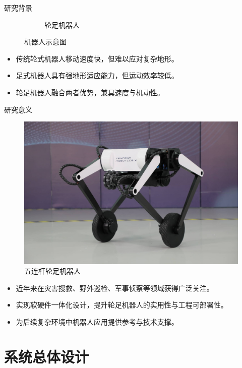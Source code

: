 \documentclass{beamer}
\begin{document}
\begin{frame}{研究背景}
\begin{figure}[t]
\begin{subfigure}{0.3\textwidth}
				\caption{轮足机器人}
			\end{subfigure}
			\captionsetup{font=scriptsize} 
			\caption{机器人示意图} 
		\end{figure}
		\begin{itemize}
			\item 传统轮式机器人移动速度快，但难以应对复杂地形。
			\item 足式机器人具有强地形适应能力，但运动效率较低。
			\item 轮足机器人融合两者优势，兼具速度与机动性。

		\end{itemize}
	\end{frame}
	
	\begin{frame}{研究意义}
		\begin{figure}          
			\centering              
			\includegraphics[width=0.4\linewidth]{img/chapter1/2}  
			\captionsetup{font=scriptsize} 
			\caption{五连杆轮足机器人} 
		\end{figure}  
		\begin{itemize}
			\item 近年来在灾害搜救、野外巡检、军事侦察等领域获得广泛关注。
			\item 实现软硬件一体化设计，提升轮足机器人的实用性与工程可部署性。
			\item 为后续复杂环境中机器人应用提供参考与技术支撑。
		\end{itemize}
	\end{frame}

	
	

	

	
	
	
	
	\section[系统总体设计]{系统总体设计}
\end{document}
